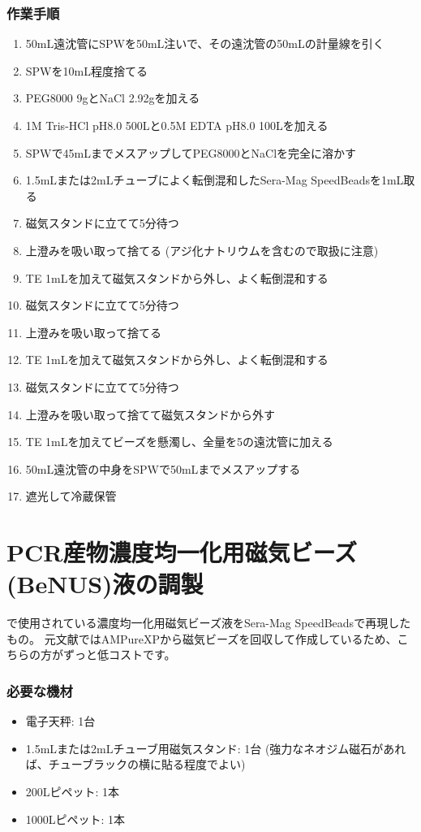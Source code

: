\documentclass[titlepage,10pt,a4paper,uplatex]{jsbook}
\begin{document}
\subsubsection{作業手順}
\begin{enumerate}
\item 50mL遠沈管にSPWを50mL注いで、その遠沈管の50mLの計量線を引く
\item SPWを10mL程度捨てる
\item PEG8000 9gとNaCl 2.92gを加える
\item 1M Tris-HCl pH8.0 500{\textmu}Lと0.5M EDTA pH8.0 100{\textmu}Lを加える
\item SPWで45mLまでメスアップしてPEG8000とNaClを完全に溶かす
\item 1.5mLまたは2mLチューブによく転倒混和したSera-Mag SpeedBeadsを1mL取る
\item 磁気スタンドに立てて5分待つ
\item 上澄みを吸い取って捨てる (アジ化ナトリウムを含むので取扱に注意)
\item TE 1mLを加えて磁気スタンドから外し、よく転倒混和する
\item 磁気スタンドに立てて5分待つ
\item 上澄みを吸い取って捨てる
\item TE 1mLを加えて磁気スタンドから外し、よく転倒混和する
\item 磁気スタンドに立てて5分待つ
\item 上澄みを吸い取って捨てて磁気スタンドから外す
\item TE 1mLを加えてビーズを懸濁し、全量を5の遠沈管に加える
\item 50mL遠沈管の中身をSPWで50mLまでメスアップする
\item 遮光して冷蔵保管
\end{enumerate}

\section{PCR産物濃度均一化用磁気ビーズ(BeNUS)液の調製}\label{makingBeNUS}

\citet{Hosomichi2013,Hosomichi2014}で使用されている濃度均一化用磁気ビーズ液をSera-Mag SpeedBeadsで再現したもの。
元文献ではAMPureXPから磁気ビーズを回収して作成しているため、こちらの方がずっと低コストです。

\subsubsection{必要な機材}
\begin{itemize}
\item 電子天秤: 1台
\item 1.5mLまたは2mLチューブ用磁気スタンド: 1台 (強力なネオジム磁石があれば、チューブラックの横に貼る程度でよい)
\item 200{\textmu}Lピペット: 1本
\item 1000{\textmu}Lピペット: 1本
\end{itemize}
\end{document}
